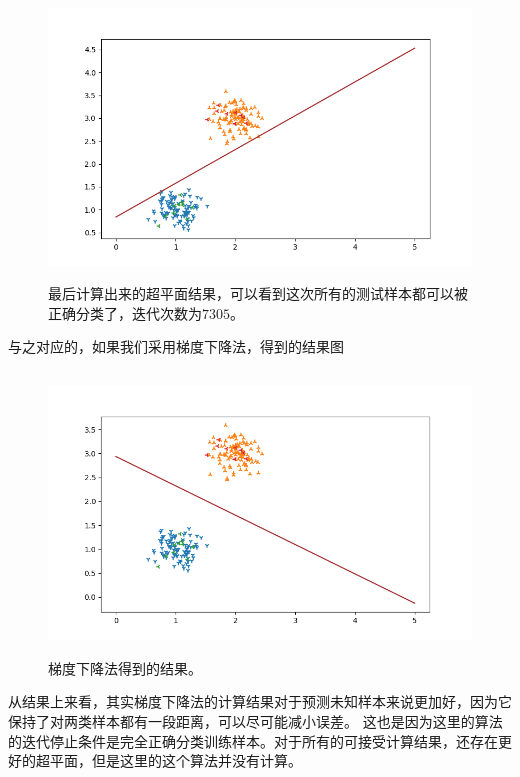 \documentclass{article}
\begin{document}
\begin{figure}[H]
    \centering
    \begin{minipage}[t]{1.0\linewidth}
        \centering
        \includegraphics[height=7.5cm]{Figure_4.png}
        \caption{最后计算出来的超平面结果，可以看到这次所有的测试样本都可以被正确分类了，迭代次数为$7305$。}
    \end{minipage}
 \end{figure}


 与之对应的，如果我们采用梯度下降法，得到的结果图
\begin{figure}[H]
    \centering
    \begin{minipage}[t]{1.0\linewidth}
        \centering
        \includegraphics[height=7.5cm]{Figure_5.png}
        \caption{梯度下降法得到的结果。}
    \end{minipage}
 \end{figure}
 从结果上来看，其实梯度下降法的计算结果对于预测未知样本来说更加好，因为它保持了对两类样本都有一段距离，可以尽可能减小误差。
 这也是因为这里的算法的迭代停止条件是完全正确分类训练样本。对于所有的可接受计算结果，还存在更好的超平面，但是这里的这个算法并没有计算。
\end{document}

